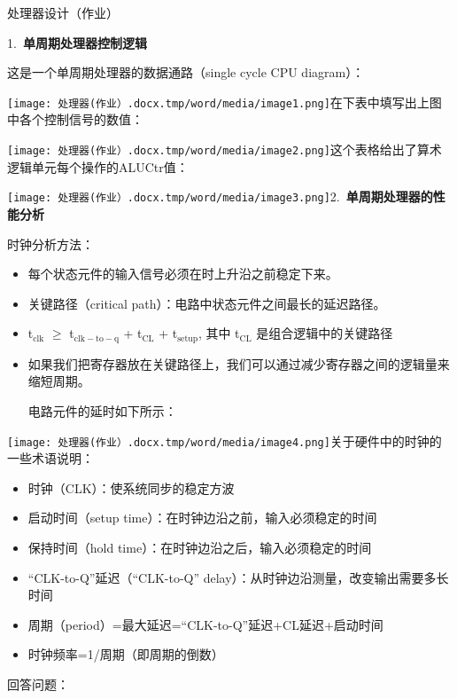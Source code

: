 \documentclass{scrbook}
\begin{document}
\begin{center}
处理器设计（作业）
\end{center}


1.~\textbf{单周期处理器控制逻辑}\label{mark-1.}

这是一个单周期处理器的数据通路（single cycle CPU diagram）：

\texttt{[image: 处理器(作业）.docx.tmp/word/media/image1.png]}\textcolor{color-1}{在下表中填写出上图中各个控制信号的数值：}

\texttt{[image: 处理器(作业）.docx.tmp/word/media/image2.png]}这个表格给出了算术逻辑单元每个操作的ALUCtr值：

\texttt{[image: 处理器(作业）.docx.tmp/word/media/image3.png]}2.~\textbf{单周期处理器的性能分析}\label{mark-2.}

时钟分析方法： 
\begin{itemize}
\item 每个状态元件的输入信号必须在时上升沿之前稳定下来。 

\item 关键路径（critical path）：电路中状态元件之间最长的延迟路径。 

\item t$_{\mathrm{clk}}$ ${\geq}$ t$_{\mathrm{clk-to-q}}$ + t$_{\mathrm{CL}}$ + t$_{\mathrm{setup}}$, 其中 t$_{\mathrm{CL}}$ 是组合逻辑中的关键路径 

\item 如果我们把寄存器放在关键路径上，我们可以通过减少寄存器之间的逻辑量来缩短周期。

电路元件的延时如下所示：


\end{itemize}
\texttt{[image: 处理器(作业）.docx.tmp/word/media/image4.png]}关于硬件中的时钟的一些术语说明：
\begin{itemize}
\item 时钟（CLK）：使系统同步的稳定方波

\item 启动时间（setup time）：在时钟边沿之前，输入必须稳定的时间

\item 保持时间（hold time）：在时钟边沿之后，输入必须稳定的时间

\item ``CLK-to-Q''延迟（``CLK-to-Q'' delay）：从时钟边沿测量，改变输出需要多长时间

\item 周期（period）=最大延迟=``CLK-to-Q''延迟+CL延迟+启动时间

\item 时钟频率=1/周期（即周期的倒数）


\end{itemize}
\textcolor{color-1}{回答问题：}
\end{document}
